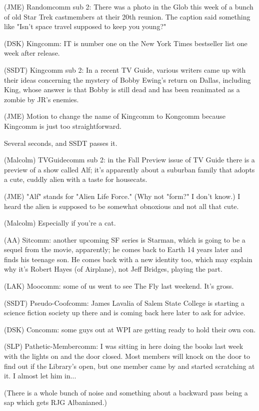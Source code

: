 \documentclass[12pt]{article}
\begin{document}
(JME) Randomcomm sub 2: There was a photo in the Glob this week of a bunch of old Star Trek castmembers at their 20th reunion. The caption said something like "Isn't space travel supposed to keep you young?"

(DSK) Kingcomm: IT is number one on the New York Times bestseller list one week after release.

(SSDT) Kingcomm sub 2: In a recent TV Guide, various writers came up with their ideas concerning the mystery of Bobby Ewing's return on Dallas, including King, whose answer is that Bobby is still dead and has been reanimated as a zombie by JR's enemies.

(JME) Motion to change the name of Kingcomm to Kongcomm because Kingcomm is just too straightforward.

Several seconds, and SSDT passes it.

(Malcolm) TVGuidecomm sub 2: in the Fall Preview issue of TV Guide there is a preview of a show called Alf; it's apparently about a suburban family that adopts a cute, cuddly alien with a taste for housecats.

(JME) "Alf" stands for "Alien Life Force." (Why not "form?" I don't know.) I heard the alien is supposed to be somewhat obnoxious and not all that cute.

(Malcolm) Especially if you're a cat.

(AA) Sitcomm: another upcoming SF series is Starman, which is going to be a sequel from the movie, apparently; he comes back to Earth 14 years later and finds his teenage son. He comes back with a new identity too, which may explain why it's Robert Hayes (of Airplane), not Jeff Bridges, playing the part.

(LAK) Moocomm: some of us went to see The Fly last weekend. It's gross.

(SSDT) Pseudo-Coofcomm: James Lavalia of Salem State College is starting a science fiction society up there and is coming back here later to ask for advice.

(DSK) Concomm: some guys out at WPI are getting ready to hold their own con.

(SLP) Pathetic-Membercomm: I was sitting in here doing the books last week with the lights on and the door closed. Most members will knock on the door to find out if the Library's open, but one member came by and started scratching at it. I almost let him in...

(There is a whole bunch of noise and something about a backward pass being a sap which gets RJG Albanianed.)
\end{document}
